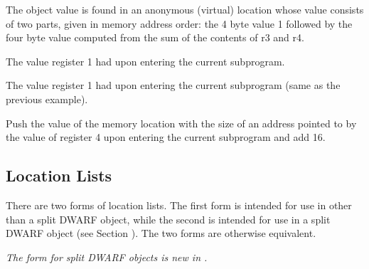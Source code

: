 \begin{description}
\vspace{-2\parsep}
The object value is found in an anonymous (virtual) location whose
value consists of two parts, given in memory address order: the 4 byte
value 1 followed by the four byte value computed from the sum of the
contents of r3 and r4.

\descriptionitemnl{\DWOPentryvalue{} 1 \DWOPregone{} \DWOPstackvalue }
The value register 1 had upon entering the current subprogram.

\descriptionitemnl{\DWOPentryvalue{} 2 \DWOPbregone{} 0 \DWOPstackvalue }
The value register 1 had upon entering the current subprogram (same as the previous example).


\descriptionitemnl{\DWOPentryvalue{} 3 \DWOPbregfour{} 16 \DWOPderef{} \DWOPstackvalue }
Push the value of the
memory location with the size of an address pointed to by the value of
register 4 upon entering the current subprogram and add 16.

\end{description}


\subsection{Location Lists}
\label{chap:locationlists}
There are two forms of location lists. The first form 
is intended for use in other than a split DWARF object,
while the second is intended for use in a split DWARF object
(see Section ). The two
forms are otherwise equivalent.

\textit{The form for split DWARF objects is new in \DWARFVersionV.}

